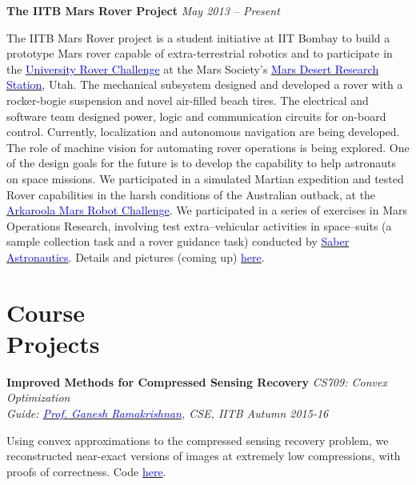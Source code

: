 \documentclass[margin,line]{res}
\newenvironment{list1}{
  \begin{list}{\ding{113}}{%
      \setlength{\itemsep}{0in}
      \setlength{\parsep}{0in} \setlength{\parskip}{0in}
      \setlength{\topsep}{0in} \setlength{\partopsep}{0in} 
      \setlength{\leftmargin}{0.17in}}}{\end{list}}
\begin{document}
\begin{resume}
{\bf The IITB Mars Rover Project}
\hfill {\it May 2013 -- Present} \\
\vspace*{-.13in}
\begin{list1}
\item[]
The IITB Mars Rover project is a student initiative at IIT Bombay to build a prototype Mars rover capable of extra-terrestrial robotics and to participate in the \href{http://urc.marssociety.org/}{\textcolor{blue} {University Rover Challenge}} at the Mars Society's \href{http://mdrs.marssociety.org/}{\textcolor{blue} {Mars Desert Research Station}}, Utah. The mechanical subsystem designed and developed a rover with a rocker-bogie suspension and novel air-filled beach tires. The electrical and software team designed power, logic and communication circuits for on-board control. Currently, localization and autonomous navigation are being developed. The role of machine vision for automating rover operations is being explored. One of the design goals for the future is to develop the capability to help astronauts on space missions. We participated in a simulated Martian expedition and tested Rover capabilities in the harsh conditions of the Australian outback, at the \href{http://marssociety.org.au/article/arkaroola-mars-robot-challenge-spaceward-bound-expedition}{\textcolor{blue} {Arkaroola Mars Robot Challenge}}. We participated in a series of exercises in Mars Operations Research, involving test extra--vehicular activities in space--suits (a sample collection task and a rover guidance task) conducted by \href{https://saberastro.com/}{\textcolor{blue} {Saber Astronautics}}. Details and pictures (coming up) \href{http://alankarkotwal.github.io/}{\textcolor{blue} {here}}.
\end{list1}

\section{\sc Course \\Projects}
{\bf Improved Methods for Compressed Sensing Recovery} \hfill {\it CS709: Convex Optimization} \\
{\em Guide: \href{https://www.cse.iitb.ac.in/~ganesh/}{\textcolor{blue}{Prof. Ganesh Ramakrishnan}}, CSE, IITB \hfill Autumn 2015-16} \\
\vspace*{-.15in}
\begin{list1}
\item[] Using convex approximations to the compressed sensing recovery problem, we reconstructed near-exact versions of images at extremely low compressions, with proofs of correctness. Code \href{https://github.com/alankarkotwal/cs-rank-minimization}{\textcolor{blue} {here}}.
\end{list1}


\end{resume}
\end{document}
